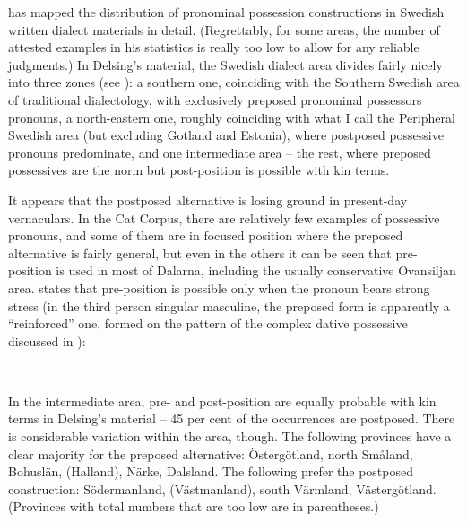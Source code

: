 \citet[32]{Delsing2003a} has mapped the distribution of pronominal possession constructions in Swedish written dialect materials in detail. (Regrettably, for some areas, the number of attested examples in his statistics is really too low to allow for any reliable judgments.) In Delsing’s material, the Swedish dialect area divides fairly nicely into three zones (see ): a southern one, coinciding with the Southern Swedish area of traditional dialectology, with exclusively preposed pronominal possessors pronouns, a north-eastern one, roughly coinciding with what I call the Peripheral Swedish area (but excluding Gotland and Estonia), where postposed possessive pronouns predominate, and one intermediate area – the rest, where preposed possessives are the norm but post-position is possible with kin terms.

It appears that the postposed alternative is losing ground in present-day vernaculars. In the Cat Corpus, there are relatively few examples of possessive pronouns, and some of them are in focused position where the preposed alternative is fairly general, but even in the others it can be seen that pre-position is used in most of Dalarna, including the usually conservative Ovansiljan area. \citet[111]{Levander1909} states that pre-position is possible only when the pronoun bears strong stress (in the third person singular masculine, the preposed form is apparently a “reinforced” one, formed on the pattern of the complex dative possessive discussed in ):

\ea
{}\\
\z
\z

In the intermediate area, pre- and post-position are equally probable with kin terms in Delsing’s material – 45 per cent of the occurrences are postposed. There is considerable variation within the area, though. The following provinces have a clear majority for the preposed alternative: Östergötland, north Småland, Bohuslän, (Halland), Närke, Dalsland. The following prefer the postposed construction: Södermanland, (Västmanland), south Värmland, Västergötland. (Provinces with total numbers that are too low are in parentheses.)

